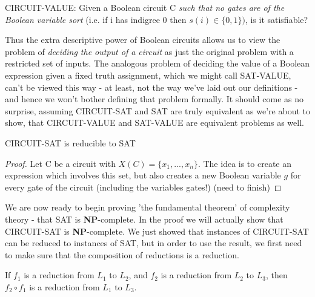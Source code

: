 \begin{problem}
    CIRCUIT-VALUE: Given a Boolean circuit C \textit{such that no gates are of the Boolean variable sort} (i.e. if i has indigree 0 then $s(i) \in \{0,1\})$, is it satisfiable?
\end{problem}
Thus the extra descriptive power of Boolean circuits allows us to view the problem of \textit{deciding the output of a circuit} as just the original problem with a restricted set of inputs. The analogous problem of deciding the value of a Boolean expression given a fixed truth assignment, which we might call SAT-VALUE, can't be viewed this way - at least, not the way we've laid out our definitions - and hence we won't bother defining that problem formally. It should come as no surprise, assuming CIRCUIT-SAT and SAT are truly equivalent as we're about to show, that CIRCUIT-VALUE and SAT-VALUE are equivalent problems as well.
\begin{fact}
    CIRCUIT-SAT is reducible to SAT
\end{fact}
\begin{proof}
    Let C be a circuit with $X(C) = \{x_1,...,x_n\}$. The idea is to create an expression which involves this set, but also creates a new Boolean variable $g$ for every gate of the circuit (including the variables gates!)  (need to finish)
\end{proof}
We are now ready to begin proving 'the fundamental theorem' of complexity theory - that SAT is \textbf{NP}-complete. In the proof we will actually show that CIRCUIT-SAT is \textbf{NP}-complete. We just showed that instances of CIRCUIT-SAT can be reduced to instances of SAT, but in order to use the result, we first need to make sure that the composition of reductions is a reduction.
\begin{lemma}
    If $f_1$ is a reduction from $L_1$ to $L_2$, and $f_2$ is a reduction from $L_2$ to $L_3$, then $f_2 \circ f_1$ is a reduction from $L_1$ to $L_3$. 
\end{lemma}
